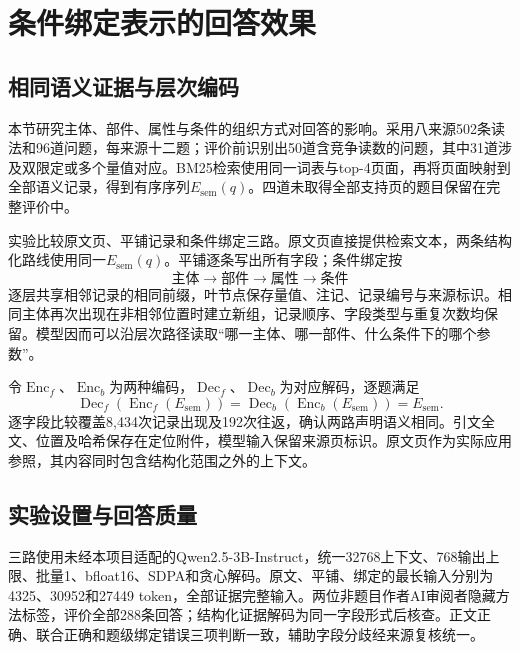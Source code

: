 \section{条件绑定表示的回答效果}
\label{sec:domain-evidence-coverage}

\subsection{相同语义证据与层次编码}

本节研究主体、部件、属性与条件的组织方式对回答的影响。采用八来源502条读法和96道问题，每来源十二题；评价前识别出50道含竞争读数的问题，其中31道涉及双限定或多个量值对应。BM25检索使用同一词表与top-4页面，再将页面映射到全部语义记录，得到有序序列$E_{\mathrm{sem}}(q)$。四道未取得全部支持页的题目保留在完整评价中。

实验比较原文页、平铺记录和条件绑定三路。原文页直接提供检索文本，两条结构化路线使用同一$E_{\mathrm{sem}}(q)$。平铺逐条写出所有字段；条件绑定按
\begin{equation}
 \text{主体}\longrightarrow\text{部件}\longrightarrow\text{属性}\longrightarrow\text{条件}
\end{equation}
逐层共享相邻记录的相同前缀，叶节点保存量值、注记、记录编号与来源标识。相同主体再次出现在非相邻位置时建立新组，记录顺序、字段类型与重复次数均保留。模型因而可以沿层次路径读取“哪一主体、哪一部件、什么条件下的哪个参数”。

令$\operatorname{Enc}_f$、$\operatorname{Enc}_b$为两种编码，$\operatorname{Dec}_f$、$\operatorname{Dec}_b$为对应解码，逐题满足
\begin{equation}
 \operatorname{Dec}_f(\operatorname{Enc}_f(E_{\mathrm{sem}}))
 =\operatorname{Dec}_b(\operatorname{Enc}_b(E_{\mathrm{sem}}))
 =E_{\mathrm{sem}}.
\label{eq:domain-equal-information}
\end{equation}
逐字段比较覆盖8,434次记录出现及192次往返，确认两路声明语义相同。引文全文、位置及哈希保存在定位附件，模型输入保留来源页标识。原文页作为实际应用参照，其内容同时包含结构化范围之外的上下文。

\subsection{实验设置与回答质量}

三路使用未经本项目适配的Qwen2.5-3B-Instruct，统一32768上下文、768输出上限、批量1、bfloat16、SDPA和贪心解码。原文、平铺、绑定的最长输入分别为4325、30952和27449 token，全部证据完整输入。两位非题目作者AI审阅者隐藏方法标签，评价全部288条回答；结构化证据解码为同一字段形式后核查。正文正确、联合正确和题级绑定错误三项判断一致，辅助字段分歧经来源复核统一。

